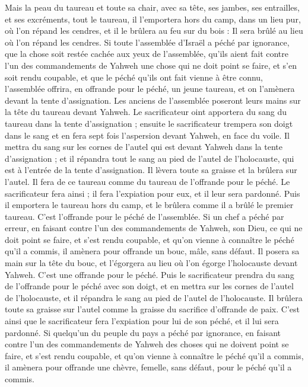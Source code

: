 \begin{multicols}{2}
Mais la peau du taureau et toute sa chair, avec sa tête, ses jambes, ses entrailles, et ses excréments,
tout le taureau, il l’emportera hors du camp, dans un lieu pur, où l'on répand les cendres, et il le brûlera au feu sur du bois : Il sera brûlé au lieu où l'on répand les cendres.
Si toute l'assemblée d'Israël a péché par ignorance, que la chose soit restée cachée aux yeux de l'assemblée, qu'ils aient fait contre l’un des commandements de Yahweh une chose qui ne doit point se faire, et s’en soit rendu coupable,
et que le péché qu'ils ont fait vienne à être connu, l'assemblée offrira, en offrande pour le péché, un jeune taureau, et on l'amènera devant la tente d'assignation.
Les anciens de l'assemblée poseront leurs mains sur la tête du taureau devant Yahweh.
Le sacrificateur oint apportera du sang du taureau dans la tente d'assignation ;
ensuite le sacrificateur trempera son doigt dans le sang et en fera sept fois l’aspersion devant Yahweh, en face du voile.
Il mettra du sang sur les cornes de l'autel qui est devant Yahweh dans la tente d'assignation ; et il répandra tout le sang au pied de l'autel de l'holocauste, qui est à l'entrée de la tente d'assignation.
Il lèvera toute sa graisse et la brûlera sur l'autel.
Il fera de ce taureau comme du taureau de l'offrande pour le péché. Le sacrificateur fera ainsi ; il fera l’expiation pour eux, et il leur sera pardonné.
Puis il emportera le taureau hors du camp, et le brûlera comme il a brûlé le premier taureau. C'est l'offrande pour le péché de l'assemblée.
Si un chef a péché par erreur, en faisant contre l’un des commandements de Yahweh, son Dieu, ce qui ne doit point se faire, et s'est rendu coupable,
et qu'on vienne à connaître le péché qu'il a commis, il amènera pour offrande un bouc, mâle, sans défaut.
Il posera sa main sur la tête du bouc, et l'égorgera au lieu où l'on égorge l'holocauste devant Yahweh. C'est une offrande pour le péché.
Puis le sacrificateur prendra du sang de l'offrande pour le péché avec son doigt, et en mettra sur les cornes de l'autel de l'holocauste, et il répandra le sang au pied de l'autel de l'holocauste.
Il brûlera toute sa graisse sur l'autel comme la graisse du sacrifice d’offrande de paix. C’est ainsi que le sacrificateur fera l’expiation pour lui de son péché, et il lui sera pardonné.
Si quelqu’un du peuple du pays a péché par ignorance, en faisant contre l’un des commandements de Yahweh des choses qui ne doivent point se faire, et s'est rendu coupable,
et qu'on vienne à connaître le péché qu'il a commis, il amènera pour offrande une chèvre, femelle, sans défaut, pour le péché qu'il a commis.

\end{multicols}
